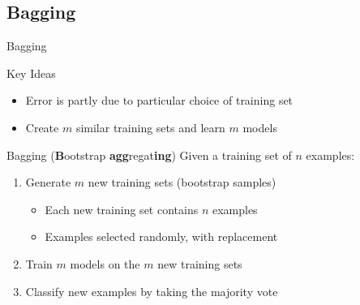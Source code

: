 \documentclass[12pt]{beamer}
\begin{document}
\subsection{Bagging}
\begin{frame}[<+->]{Bagging}
	\begin{block}{Key Ideas}
		\begin{itemize}
			\item Error is partly due to particular choice of training set
			\item Create $m$ similar training sets and learn $m$ models
		\end{itemize}
	\end{block}
	\begin{block}{Bagging (\textbf{B}ootstrap \textbf{agg}regat\textbf{ing})}
		Given a training set of $n$ examples:
		\begin{enumerate}
			\item Generate $m$ new training sets (\alert{bootstrap samples})
				\begin{itemize}
					\item Each new training set contains $n$ examples
					\item Examples selected randomly, with replacement
				\end{itemize}
			\item Train $m$ models on the $m$ new training sets
			\item Classify new examples by taking the majority vote
		\end{enumerate}
	\end{block}
\end{frame}
\end{document}
